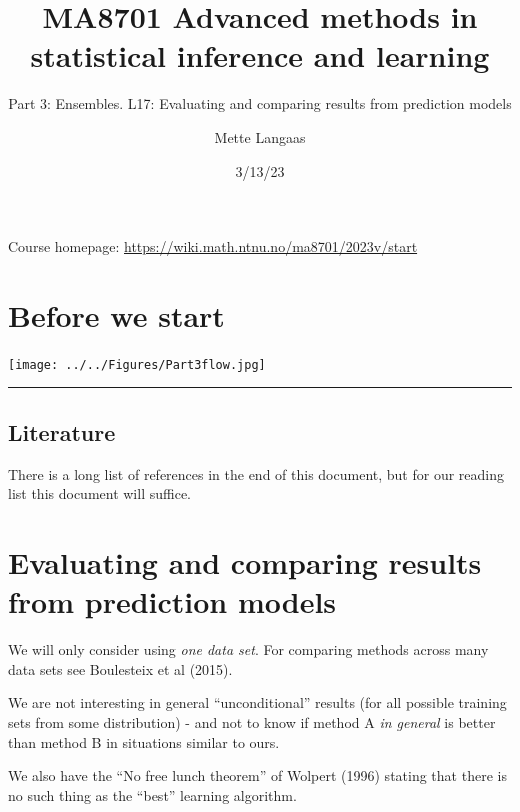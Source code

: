 \documentclass[
  letterpaper,
  DIV=11,
  numbers=noendperiod]{scrartcl}
\title{MA8701 Advanced methods in statistical inference and learning}
\subtitle{Part 3: Ensembles. L17: Evaluating and comparing results from
prediction models}
\author{Mette Langaas}
\date{3/13/23}
\renewcommand*\contentsname{Table of contents}
\newcommand\contentsname{Table of contents}
\begin{document}
\maketitle
\ifdefined\Shaded\renewenvironment{Shaded}{\begin{tcolorbox}[boxrule=0pt, frame hidden, borderline west={3pt}{0pt}{shadecolor}, interior hidden, sharp corners, enhanced, breakable]}{\end{tcolorbox}}\fi

\renewcommand*\contentsname{Table of contents}
{
\hypersetup{linkcolor=}
\setcounter{tocdepth}{3}
\tableofcontents
}
Course homepage: \url{https://wiki.math.ntnu.no/ma8701/2023v/start}

\hypertarget{before-we-start}{%
\section{Before we start}\label{before-we-start}}

\texttt{[image: ../../Figures/Part3flow.jpg]}

\begin{center}\rule{0.5\linewidth}{0.5pt}\end{center}

\hypertarget{literature}{%
\subsection{Literature}\label{literature}}

There is a long list of references in the end of this document, but for
our reading list this document will suffice.

\hypertarget{evaluating-and-comparing-results-from-prediction-models}{%
\section{Evaluating and comparing results from prediction
models}\label{evaluating-and-comparing-results-from-prediction-models}}

We will only consider using \emph{one data set}. For comparing methods
across many data sets see Boulesteix et al (2015).

We are not interesting in general ``unconditional'' results (for all
possible training sets from some distribution) - and not to know if
method A \emph{in general} is better than method B in situations similar
to ours.

We also have the ``No free lunch theorem'' of Wolpert (1996) stating
that there is no such thing as the ``best'' learning algorithm.
\end{document}
